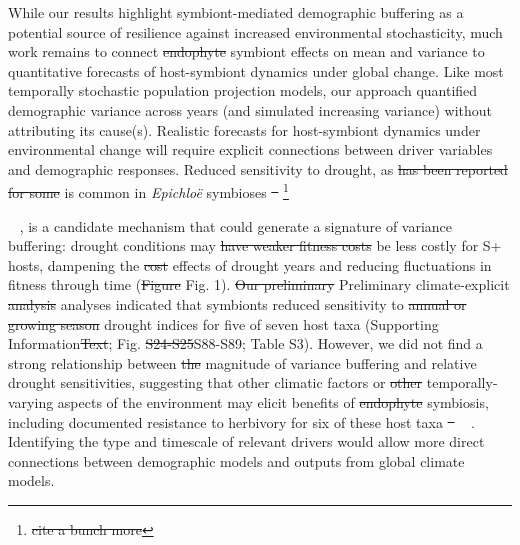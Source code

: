 \documentclass[lineno, sn-basic]{sn-jnl}%
\providecommand{\DIFadd}[1]{{\protect\color{blue}#1}} %
\providecommand{\DIFdel}[1]{{\protect\color{red}\protect\scriptsize\sout{#1}}}
\providecommand{\DIFadd}[1]{{\protect\color{blue}\uwave{#1}}} %
\providecommand{\DIFdel}[1]{{\protect\color{red}\sout{#1}}}                      %
\providecommand{\DIFaddbegin}{} %
\providecommand{\DIFaddend}{} %
\providecommand{\DIFdelbegin}{} %
\providecommand{\DIFdelend}{} %
\newcommand{\DIFscaledelfig}{0.5}
\newlength{\DIFdelgraphicswidth} %
\newlength{\DIFdelgraphicsheight} %
\newcommand{\DIFaddincludegraphics}[2][]{{\color{blue}\fbox{\DIFOincludegraphics[#1]{#2}}}} %
\newcommand{\DIFdelincludegraphics}[2][]{%
\sbox{\DIFdelgraphicsbox}{\DIFOincludegraphics[#1]{#2}}%
\settoboxwidth{\DIFdelgraphicswidth}{\DIFdelgraphicsbox} %
\settoboxtotalheight{\DIFdelgraphicsheight}{\DIFdelgraphicsbox} %
\scalebox{\DIFscaledelfig}{%
\parbox[b]{\DIFdelgraphicswidth}{\usebox{\DIFdelgraphicsbox}\\[-\baselineskip] \rule{\DIFdelgraphicswidth}{0em}}\llap{\resizebox{\DIFdelgraphicswidth}{\DIFdelgraphicsheight}{%
\setlength{\unitlength}{\DIFdelgraphicswidth}%
\begin{picture}(1,1)%
\thicklines\linethickness{2pt} %
{\color[rgb]{1,0,0}\put(0,0){\framebox(1,1){}}}%
{\color[rgb]{1,0,0}\put(0,0){\line( 1,1){1}}}%
{\color[rgb]{1,0,0}\put(0,1){\line(1,-1){1}}}%
\end{picture}%
}\hspace*{3pt}}} %
} %
\DeclareRobustCommand{\DIFaddbegin}{\DIFOaddbegin \let\includegraphics\DIFaddincludegraphics} %
\DeclareRobustCommand{\DIFaddend}{\DIFOaddend \let\includegraphics\DIFOincludegraphics} %
\DeclareRobustCommand{\DIFdelbegin}{\DIFOdelbegin \let\includegraphics\DIFdelincludegraphics} %
\DeclareRobustCommand{\DIFdelend}{\DIFOaddend \let\includegraphics\DIFOincludegraphics} %
\begin{document}
While our results highlight symbiont-mediated demographic buffering as a potential source of resilience against increased environmental stochasticity, much work remains to connect \DIFdelbegin \DIFdel{endophyte }\DIFdelend \DIFaddbegin \DIFadd{symbiont }\DIFaddend effects on mean and variance to quantitative forecasts of host-symbiont dynamics under global change. 
Like most temporally stochastic population projection models, our approach quantified demographic variance across years (and simulated increasing variance) without attributing its cause(s). 
Realistic forecasts for host-symbiont dynamics under environmental change will require explicit connections between driver variables and demographic responses. 
Reduced sensitivity to drought, as \DIFdelbegin \DIFdel{has been reported for some }\DIFdelend \DIFaddbegin \DIFadd{is common in }\DIFaddend \emph{Epichlo\"{e}} symbioses \DIFdelbegin \DIFdel{\mbox{%
\cite{decunta2021systematic}}\hspace{0pt}%
}\footnote{\DIFdel{cite a bunch more}}%
\addtocounter{footnote}{-1}%
\DIFdelend \DIFaddbegin \DIFadd{\mbox{%
\citep{reyna2012detection,saikkonen2013chemical,neyaz2022localization,decunta2021systematic}}\hspace{0pt}%
}\DIFaddend , is a candidate mechanism that could generate a signature of variance buffering: drought conditions may \DIFdelbegin \DIFdel{have weaker fitness costs }\DIFdelend \DIFaddbegin \DIFadd{be less costly }\DIFaddend for S+ hosts, dampening the \DIFdelbegin \DIFdel{cost }\DIFdelend \DIFaddbegin \DIFadd{effects }\DIFaddend of drought years and reducing fluctuations in fitness through time (\DIFdelbegin \DIFdel{Figure }\DIFdelend \DIFaddbegin \DIFadd{Fig. }\DIFaddend 1).
\DIFdelbegin \DIFdel{Our preliminary }\DIFdelend \DIFaddbegin \DIFadd{Preliminary }\DIFaddend climate-explicit \DIFdelbegin \DIFdel{analysis }\DIFdelend \DIFaddbegin \DIFadd{analyses }\DIFaddend indicated that symbionts reduced sensitivity to \DIFdelbegin \DIFdel{annual or growing season }\DIFdelend drought indices for five of seven host taxa (Supporting Information\DIFdelbegin \DIFdel{Text}\DIFdelend ; Fig. \DIFdelbegin \DIFdel{S24-S25}\DIFdelend \DIFaddbegin \DIFadd{S88-S89}\DIFaddend ; Table S3).
However, we did not find a strong relationship between \DIFdelbegin \DIFdel{the }\DIFdelend magnitude of variance buffering and relative drought sensitivities, suggesting that other climatic factors or \DIFdelbegin \DIFdel{other }\DIFdelend temporally-varying aspects of the environment may elicit benefits of \DIFdelbegin \DIFdel{endophyte }\DIFdelend symbiosis, including documented resistance to herbivory for six of these host taxa \DIFdelbegin \DIFdel{\mbox{%
\cite{rudgers2008invasive,crawford2010fungal}}\hspace{0pt}%
}\DIFdelend \DIFaddbegin \DIFadd{\mbox{%
\citep{rudgers2008invasive,crawford2010fungal}}\hspace{0pt}%
}\DIFaddend .
Identifying the type and timescale of relevant drivers would allow more direct connections between demographic models and outputs from global climate models.
\end{document}
